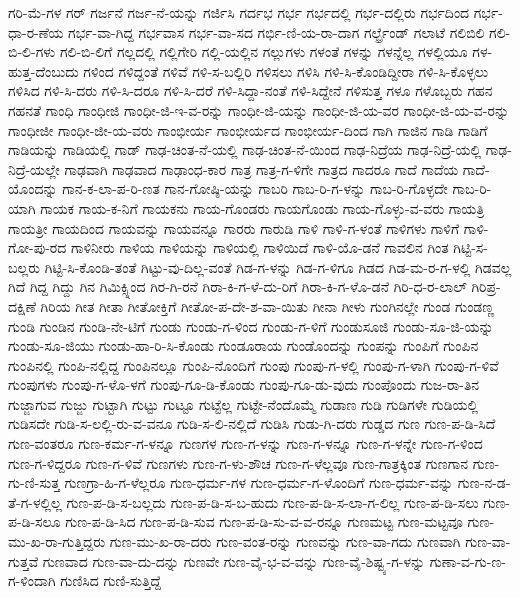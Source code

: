 {ಗರಿ-ಮೆ-ಗಳ
ಗರ್
ಗರ್ಜನೆ
ಗರ್ಜ-ನೆ-ಯನ್ನು
ಗರ್ಜಿಸಿ
ಗರ್ದಭ
ಗರ್ಭ
ಗರ್ಭದಲ್ಲಿ
ಗರ್ಭ-ದಲ್ಲಿರು
ಗರ್ಭದಿಂದ
ಗರ್ಭ-ಧಾ-ರ-ಣೆಯ
ಗರ್ಭ-ವಾ-ಗಿದ್ದ
ಗರ್ಭವಾಸ
ಗರ್ಭ-ವಾ-ಸದ
ಗರ್ಭಿ-ಣಿ-ಯ-ರಾ-ದಾಗ
ಗರ್ಲ್ಫ್ರೆಂಡ್
ಗಲಾಟೆ
ಗಲಿಬಿಲಿ
ಗಲಿ-ಬಿ-ಲಿ-ಗಳು
ಗಲಿ-ಬಿ-ಲಿಗೆ
ಗಲ್ಲದಲ್ಲಿ
ಗಲ್ಲಿಗೇರಿ
ಗಲ್ಲಿ-ಯಲ್ಲಿನ
ಗಲ್ಲುಗಳು
ಗಳಂತೆ
ಗಳನ್ನು
ಗಳನ್ನೆಲ್ಲ
ಗಳಲ್ಲಿಯೂ
ಗಳ-ಹುತ್ತ-ದೆಂಬುದು
ಗಳಿಂದ
ಗಳಿದ್ದಂತೆ
ಗಳಿವೆ
ಗಳಿ-ಸ-ಬಲ್ಲಿರಿ
ಗಳಿಸಲು
ಗಳಿಸಿ
ಗಳಿ-ಸಿ-ಕೊಂಡಿದ್ದೀರಾ
ಗಳಿ-ಸಿ-ಕೊಳ್ಳಲು
ಗಳಿಸಿದ
ಗಳಿ-ಸಿ-ದರು
ಗಳಿ-ಸಿ-ದರೂ
ಗಳಿ-ಸಿ-ದರೆ
ಗಳಿ-ಸಿದ್ದಾ-ನಂತೆ
ಗಳಿ-ಸಿದ್ದೇನೆ
ಗಳಿಸುತ್ತ
ಗಳೂ
ಗಳೊಬ್ಬರು
ಗಹನ
ಗಹನತೆ
ಗಾಂಧಿ
ಗಾಂಧೀಜಿ
ಗಾಂಧೀ-ಜಿ-ಇ-ವ-ರನ್ನು
ಗಾಂಧೀ-ಜಿ-ಯನ್ನು
ಗಾಂಧೀ-ಜಿ-ಯ-ವರ
ಗಾಂಧೀ-ಜಿ-ಯ-ವ-ರನ್ನು
ಗಾಂಧೀಜೀ
ಗಾಂಧೀ-ಜೀ-ಯ-ವರು
ಗಾಂಭೀರ್ಯ
ಗಾಂಭೀರ್ಯದ
ಗಾಂಭೀರ್ಯ-ದಿಂದ
ಗಾಗಿ
ಗಾಜಿನ
ಗಾಡಿ
ಗಾಡಿಗೆ
ಗಾಡಿಯನ್ನು
ಗಾಡಿಯಲ್ಲಿ
ಗಾಡ್
ಗಾಢ-ಚಿಂತ-ನೆ-ಯಲ್ಲಿ
ಗಾಢ-ಚಿಂತ-ನೆ-ಯಿಂದ
ಗಾಢ-ನಿದ್ರೆಯ
ಗಾಢ-ನಿದ್ರೆ-ಯಲ್ಲಿ
ಗಾಢ-ನಿದ್ರೆ-ಯಲ್ಲೇ
ಗಾಢವಾಗಿ
ಗಾಢವಾದ
ಗಾಢಾಂಧ-ಕಾರ
ಗಾತ್ರ
ಗಾತ್ರ-ಗ-ಳಿಗೇ
ಗಾತ್ರದ
ಗಾದರೂ
ಗಾದೆ
ಗಾದೆಯ
ಗಾದೆ-ಯೊಂದನ್ನು
ಗಾನ-ಕ-ಲಾ-ಪ-ರಿ-ಣತ
ಗಾನ-ಗೋಷ್ಠಿ-ಯನ್ನು
ಗಾಬರಿ
ಗಾಬ-ರಿ-ಗ-ಳನ್ನು
ಗಾಬ-ರಿ-ಗೊಳ್ಳದೇ
ಗಾಬ-ರಿ-ಯಾಗಿ
ಗಾಯಕ
ಗಾಯ-ಕ-ನಿಗೆ
ಗಾಯಕನು
ಗಾಯ-ಗೊಂಡರು
ಗಾಯಗೊಂಡು
ಗಾಯ-ಗೊಳ್ಳು-ವ-ವರು
ಗಾಯತ್ರಿ
ಗಾಯತ್ರೀ
ಗಾಯದಿಂದ
ಗಾಯವನ್ನು
ಗಾಯವನ್ನೂ
ಗಾರರು
ಗಾರುಡಿ
ಗಾಳಿ
ಗಾಳಿ-ಗ-ಳಂತೆ
ಗಾಳಿಗಳು
ಗಾಳಿಗೆ
ಗಾಳಿ-ಗೋ-ಪು-ರದ
ಗಾಳಿನೀರು
ಗಾಳಿಯ
ಗಾಳಿಯನ್ನು
ಗಾಳಿಯಲ್ಲಿ
ಗಾಳಿಯಿದೆ
ಗಾಳಿ-ಯೊ-ಡನೆ
ಗಾವಲಿನ
ಗಿಂತ
ಗಿಟ್ಟಿ-ಸ-ಬಲ್ಲರು
ಗಿಟ್ಟಿ-ಸಿ-ಕೊಂಡಿ-ತಂತೆ
ಗಿಟ್ಟು-ವು-ದಿಲ್ಲ-ವಂತೆ
ಗಿಡ-ಗ-ಳನ್ನು
ಗಿಡ-ಗ-ಳಿಗೂ
ಗಿಡದ
ಗಿಡ-ಮ-ರ-ಗ-ಳಲ್ಲಿ
ಗಿಡವಲ್ಲ
ಗಿದೆ
ಗಿದ್ದ
ಗಿದ್ದು
ಗಿನ
ಗಿಮಿಕ್ಸ್ನಿಂದ
ಗಿರ-ಗಿ-ರನೆ
ಗಿರಾ-ಕಿ-ಗ-ಳೆ-ದು-ರಿಗೆ
ಗಿರಾ-ಕಿ-ಗ-ಳೊ-ಡನೆ
ಗಿರಿ-ಧ-ರ-ಲಾಲ್
ಗಿರಿಪ್ರ-ದಕ್ಷಿಣೆ
ಗಿರಿಯ
ಗೀತ
ಗೀತಾ
ಗೀತೋಕ್ತಿಗೆ
ಗೀತೋ-ಪ-ದೇ-ಶ-ವಾ-ಯಿತು
ಗೀನಾ
ಗೀಳು
ಗುಂಗಿನಲ್ಲೇ
ಗುಂಡ
ಗುಂಡಣ್ಣ
ಗುಂಡಿ
ಗುಂಡಿನ
ಗುಂಡಿ-ನೇ-ಟಿಗೆ
ಗುಂಡು
ಗುಂಡು-ಗ-ಳಿಂದ
ಗುಂಡು-ಗ-ಳಿಗೆ
ಗುಂಡುಸೂಜಿ
ಗುಂಡು-ಸೂ-ಜಿ-ಯನ್ನು
ಗುಂಡು-ಸೂ-ಜಿಯು
ಗುಂಡು-ಹಾ-ರಿ-ಸಿ-ಕೊಂಡು
ಗುಂಡೂರಾಯ
ಗುಂಡೊಂದನ್ನು
ಗುಂಪನ್ನು
ಗುಂಪಿಗೆ
ಗುಂಪಿನ
ಗುಂಪಿನಲ್ಲಿ
ಗುಂಪಿ-ನಲ್ಲಿದ್ದ
ಗುಂಪಿನಲ್ಲೂ
ಗುಂಪಿ-ನೊಂದಿಗೆ
ಗುಂಪು
ಗುಂಪು-ಗ-ಳಲ್ಲಿ
ಗುಂಪು-ಗ-ಳಾಗಿ
ಗುಂಪು-ಗ-ಳಿವೆ
ಗುಂಪುಗಳು
ಗುಂಪು-ಗ-ಳೊ-ಳಗೆ
ಗುಂಪು-ಗೂ-ಡಿ-ಕೊಂಡು
ಗುಂಪು-ಗೂ-ಡು-ವುದು
ಗುಂಪೊಂದು
ಗುಜ-ರಾ-ತಿನ
ಗುಜ್ಜಾಗುವ
ಗುಜ್ಜು
ಗುಟ್ಟಾಗಿ
ಗುಟ್ಟು
ಗುಟ್ಟೂ
ಗುಟ್ಟೆಲ್ಲ
ಗುಟ್ಟೇ-ನೆಂದೊಮ್ಮೆ
ಗುಡಾಣ
ಗುಡಿ
ಗುಡಿಗಳೇ
ಗುಡಿಯಲ್ಲಿ
ಗುಡಿಸದೇ
ಗುಡಿ-ಸ-ಲಲ್ಲಿ-ರು-ವ-ವನೂ
ಗುಡಿ-ಸ-ಲಿ-ನಲ್ಲಿದೆ
ಗುಡಿಸಿ
ಗುಡು-ಗಿ-ದರು
ಗುಡ್ಡದ
ಗುಣ
ಗುಣ-ಪ-ಡಿ-ಸಿದೆ
ಗುಣ-ವಂತರೂ
ಗುಣ-ಕರ್ಮ-ಗ-ಳನ್ನೂ
ಗುಣಗಳ
ಗುಣ-ಗ-ಳನ್ನು
ಗುಣ-ಗ-ಳನ್ನೂ
ಗುಣ-ಗ-ಳನ್ನೇ
ಗುಣ-ಗ-ಳಿಂದ
ಗುಣ-ಗ-ಳಿದ್ದರೂ
ಗುಣ-ಗ-ಳಿವೆ
ಗುಣಗಳು
ಗುಣ-ಗ-ಳು-ಶೌಚ
ಗುಣ-ಗ-ಳೆಲ್ಲವೂ
ಗುಣ-ಗಾತ್ರಕ್ಕಿಂತ
ಗುಣಗಾನ
ಗುಣ-ಗು-ಣಿ-ಸುತ್ತ
ಗುಣಗ್ರಾ-ಹಿ-ಗ-ಳೆಲ್ಲರೂ
ಗುಣ-ಧರ್ಮ-ಗಳ
ಗುಣ-ಧರ್ಮ-ಗ-ಳೊಂದಿಗೆ
ಗುಣ-ಧರ್ಮ-ವನ್ನು
ಗುಣ-ನ-ಡ-ತೆ-ಗ-ಳಲ್ಲಿಲ್ಲ
ಗುಣ-ಪ-ಡಿ-ಸ-ಬಲ್ಲದು
ಗುಣ-ಪ-ಡಿ-ಸ-ಬ-ಹುದು
ಗುಣ-ಪ-ಡಿ-ಸ-ಲಾ-ಗ-ಲಿಲ್ಲ
ಗುಣ-ಪ-ಡಿ-ಸಲು
ಗುಣ-ಪ-ಡಿ-ಸಲೂ
ಗುಣ-ಪ-ಡಿ-ಸಿದ
ಗುಣ-ಪ-ಡಿ-ಸುವ
ಗುಣ-ಪ-ಡಿ-ಸು-ವ-ವ-ರನ್ನೂ
ಗುಣಮಟ್ಟ
ಗುಣ-ಮಟ್ಟವೂ
ಗುಣ-ಮು-ಖ-ರಾ-ಗುತ್ತಿದ್ದರು
ಗುಣ-ಮು-ಖ-ರಾ-ದರು
ಗುಣ-ವಂತ-ರನ್ನು
ಗುಣವನ್ನು
ಗುಣ-ವಾ-ಗದು
ಗುಣವಾಗಿ
ಗುಣ-ವಾ-ಗುತ್ತವೆ
ಗುಣವಾದ
ಗುಣ-ವಾ-ದು-ದನ್ನು
ಗುಣವೇ
ಗುಣ-ವೈ-ಭ-ವ-ವನ್ನು
ಗುಣ-ವೈ-ಶಿಷ್ಟ್ಯ-ಗ-ಳನ್ನು
ಗುಣಾ-ವ-ಗು-ಣ-ಗ-ಳಿಂದಾಗಿ
ಗುಣಿಸಿದ
ಗುಣಿ-ಸುತ್ತಿದ್ದೆ
}
